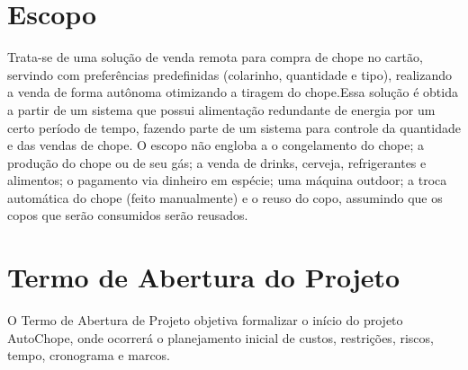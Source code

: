 	\section[Escopo]{Escopo}
		Trata-se de uma solução de venda remota para compra de chope no cartão, servindo com preferências predefinidas 
		(colarinho, quantidade e tipo), realizando a venda de forma autônoma otimizando a tiragem do chope.Essa 
		solução é obtida a partir de um sistema que possui alimentação redundante de energia por um certo período de 
		tempo, fazendo parte de um sistema para controle da quantidade e das vendas de chope. O escopo não engloba a o 
		congelamento do chope; a produção do chope ou de seu gás; a venda de drinks, cerveja, refrigerantes e 
		alimentos; o pagamento via dinheiro em espécie; uma máquina outdoor; a troca automática do chope (feito 
		manualmente) e o reuso do copo, assumindo que os copos que serão consumidos serão reusados.

	\section[Termo de Abertura do Projeto]{Termo de Abertura do Projeto}
		O Termo de Abertura de Projeto objetiva formalizar o início do projeto AutoChope, onde ocorrerá o planejamento 
		inicial de custos, restrições, riscos, tempo, cronograma e marcos. 

